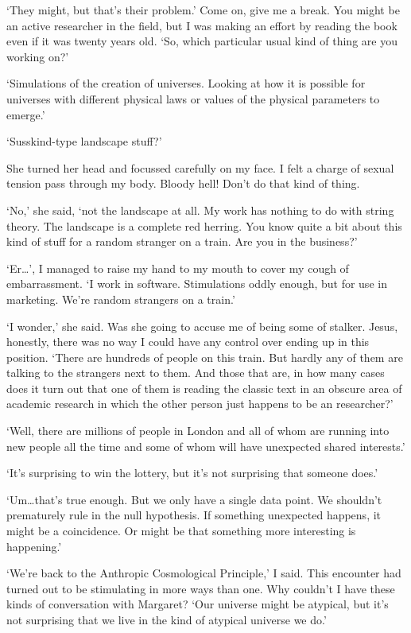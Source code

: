 `They might, but that's their problem.' Come on, give me a break.
You might be an active researcher in the field, but I was making an
effort by reading the book even if it was twenty years old. `So,
which particular usual kind of thing are you working on?'

`Simulations of the creation of universes. Looking at how it is
possible for universes with different physical laws or values of the
physical parameters to emerge.'

`Susskind-type landscape stuff?'

She turned her head and focussed carefully on my face. I felt a charge
of sexual tension pass through my body. Bloody hell! Don't do that
kind of thing.

`No,' she said, `not the landscape at all. My work has nothing to do
with string theory. The landscape is a complete red herring. You
know quite a bit about this kind of stuff for a random stranger on a
train. Are you in the business?'

`Er\dots', I managed to raise my hand to my mouth to cover my cough
of embarrassment. `I work in software. Stimulations oddly enough,
but for use in marketing. We're random strangers on a train.'

`I wonder,' she said. Was she going to accuse me of being some of
stalker. Jesus, honestly, there was no way I could have any control
over ending up in this position. `There are hundreds of people on
this train. But hardly any of them are talking to the strangers next
to them. And those that are, in how many cases does it turn out that
one of them is reading the classic text in an obscure area of
academic research in which the other person just happens to be an
researcher?'

`Well, there are millions of people in London and all of whom are
running into new people all the time and some of whom will have
unexpected shared interests.'

`It's surprising to win the lottery, but it's not surprising that
someone does.'

`Um\dots that's true enough. But we only have a single data point.
We shouldn't prematurely rule in the null hypothesis. If something
unexpected happens, it might be a coincidence. Or might be that
something more interesting is happening.'

`We're back to the Anthropic Cosmological Principle,' I said. This
encounter had turned out to be stimulating in more ways than one.
Why couldn't I have these kinds of conversation with Margaret? `Our
universe might be atypical, but it's not surprising that we live in
the kind of atypical universe we do.'

